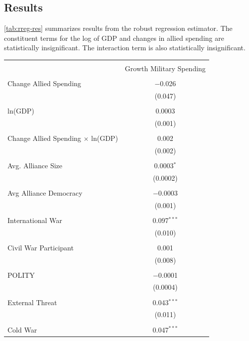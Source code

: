\documentclass[12pt]{article}
\begin{document}
\subsection{Results}

 
\autoref{tab:rreg-res} summarizes results from the robust regression estimator. 
The constituent terms for the log of GDP and changes in allied spending are statistically insignificant. 
The interaction term is also statistically insignificant. 


\begin{table}[!htbp] \centering 
\begin{tabular}{@{\extracolsep{5pt}}lc} 
\\[-1.8ex]\hline 
\hline \\[-1.8ex] 
  & Growth Military Spending \\ 
\hline \\[-1.8ex] 
 Change Allied Spending & $-$0.026 \\ 
  & (0.047) \\ 
  & \\ 
 ln(GDP) & 0.0003 \\ 
  & (0.001) \\ 
  & \\ 
 Change Allied Spending $\times$ ln(GDP) & 0.002 \\ 
  & (0.002) \\ 
  & \\ 
 Avg. Alliance Size & 0.0003$^{*}$ \\ 
  & (0.0002) \\ 
  & \\ 
 Avg Alliance Democracy & $-$0.0003 \\ 
  & (0.001) \\ 
  & \\ 
 International War & 0.097$^{***}$ \\ 
  & (0.010) \\ 
  & \\ 
 Civil War Participant & 0.001 \\ 
  & (0.008) \\ 
  & \\ 
 POLITY & $-$0.0001 \\ 
  & (0.0004) \\ 
  & \\ 
 External Threat & 0.043$^{***}$ \\ 
  & (0.011) \\ 
  & \\ 
 Cold War & 0.047$^{***}$ \\ 

\end{tabular}
\end{table}
\end{document}
